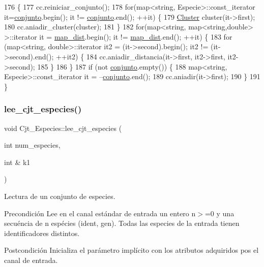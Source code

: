 \begin{DoxyCode}
176 \{
177     cc.reiniciar\_conjunto();
178     \textcolor{keywordflow}{for}(map<string, Especie>::const\_iterator it=\hyperlink{class_cjt___especies_a82ed53cbd620caca3db6b5c20b37a60a}{conjunto}.begin(); it != 
      \hyperlink{class_cjt___especies_a82ed53cbd620caca3db6b5c20b37a60a}{conjunto}.end(); ++it) \{
179         \hyperlink{class_cluster}{Cluster} cluster(it->first);
180         cc.aniadir\_cluster(cluster);
181     \}
182     \textcolor{keywordflow}{for}(map<\textcolor{keywordtype}{string}, map<string,double> >::iterator it = \hyperlink{class_cjt___especies_a9b104014aea0c1472ba4e7d7fc785e9a}{map\_dist}.begin(); it != 
      \hyperlink{class_cjt___especies_a9b104014aea0c1472ba4e7d7fc785e9a}{map\_dist}.end(); ++it) \{
183         \textcolor{keywordflow}{for} (map<string, double>::iterator it2 = (it->second).begin(); it2 != (it->second).end(); ++it2) \{
184             cc.aniadir\_distancia(it->first, it2->first, it2->second);        
185         \}
186     \}
187     \textcolor{keywordflow}{if} (not \hyperlink{class_cjt___especies_a82ed53cbd620caca3db6b5c20b37a60a}{conjunto}.empty()) \{
188         map<string, Especie>::const\_iterator it = --\hyperlink{class_cjt___especies_a82ed53cbd620caca3db6b5c20b37a60a}{conjunto}.end();
189         cc.aniadir(it->first);
190     \}
191 \}
\end{DoxyCode}
\mbox{\label{class_cjt___especies_a3550a8bb7970521eba6efa70afad88b4}} 
\subsubsection{\texorpdfstring{lee\+\_\+cjt\+\_\+especies()}{lee\_cjt\_especies()}}
{\footnotesize\ttfamily void Cjt\+\_\+\+Especies\+::lee\+\_\+cjt\+\_\+especies (\begin{DoxyParamCaption}\item[{int}]{num\+\_\+especies,  }\item[{int \&}]{k1 }\end{DoxyParamCaption})}



Lectura de un conjunto de especies. 

\begin{DoxyPrecond}{Precondición}
Lee en el canal estándar de entrada un entero n$>$=0 y una secuéncia de n espécies (ident, gen). Todas las especies de la entrada tienen identificadores distintos. 
\end{DoxyPrecond}
\begin{DoxyPostcond}{Postcondición}
Inicializa el parámetro implícito con los atributos adquiridos pos el canal de entrada. 
\end{DoxyPostcond}


